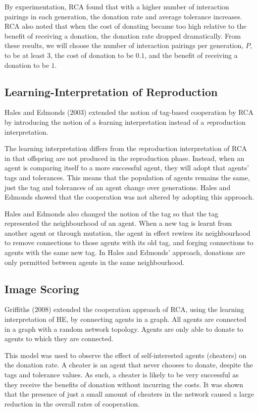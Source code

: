 By experimentation, RCA found that with a higher number of interaction
pairings in each generation, the donation rate and average tolerance
increases.  RCA also noted that when the cost of donating became
too high relative to the benefit of receiving a donation, the
donation rate dropped dramatically.  From these results, we will
choose the number of interaction pairings per generation, $P$, to
be at least $3$, the cost of donation to be $0.1$, and the benefit
of receiving a donation to be $1$.

\subsection{Learning-Interpretation of Reproduction}

Hales and Edmonds (2003) extended the notion of tag-based cooperation by RCA
by introducing the notion of a {\emph learning} interpretation instead of a {\emph reproduction} interpretation.

The learning interpretation differs from the {\emph reproduction} interpretation of RCA
in that offspring are not produced in the reproduction phase.
Instead, when an agent is comparing itself to a more successful agent,
they will adopt that agents' tags and tolerances.
This means that the population of agents remains the same,
just the tag and tolerances of an agent change over generations.
Hales and Edmonds showed that the cooperation was not altered by adopting this approach.

Hales and Edmonds also changed the notion of the tag so that
the tag represented the neighbourhood of an agent.
When a new tag is learnt from another agent or through mutation,
the agent in effect rewires its neighbourhood to remove connections to those agents with its old tag,
and forging connections to agents with the same new tag.
In Hales and Edmonds' approach, donations are only permitted between agents in the same neighbourhood.

\subsection{Image Scoring}

Griffiths (2008) extended the cooperation approach of RCA,
using the learning interpretation of HE, by connecting agents
in a graph.
All agents are connected in a graph with a random network topology.
Agents are only able to donate to agents to which they are connected.

This model was used to observe the effect of self-interested agents (cheaters)
on the donation rate.
A cheater is an agent that never chooses to donate, despite the tags and tolerance values.
As such, a cheater is likely to be very successful as they
receive the benefits of donation without incurring the costs.
It was shown that the presence of just a small amount of cheaters in the network
caused a large reduction in the overall rates of cooperation.

